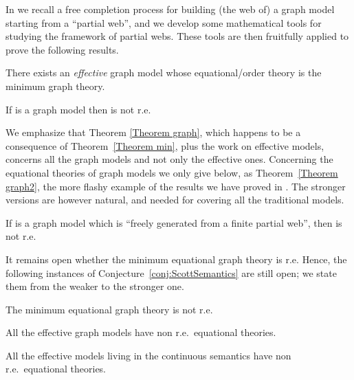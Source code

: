 \documentclass[english]{llncs}
\begin{document}
In \cite[Chapter~5]{ManzonettoTh} we recall a free completion process for building (the web of) a graph model starting from a ``partial web'',
and we develop some mathematical tools for studying the framework of partial webs. 
These tools are then fruitfully applied to prove the following results.

\begin{theorem}\label{Theorem min} \cite[Thm.~6.4.22]{ManzonettoTh}
There exists an \emph{effective} graph model whose equational/order theory is the minimum graph theory.
\end{theorem}

\begin{theorem}\label{Theorem graph} \cite[Thm.~6.4.24]{ManzonettoTh}
If  is a graph model then  is not r.e.
\end{theorem}

We emphasize that Theorem \ref{Theorem graph}, which happens to be a consequence of Theorem~\ref{Theorem min}, 
plus the work on effective models, concerns all the graph models and not only the effective ones.
Concerning the equational theories of graph models we only give below, as Theorem~\ref{Theorem graph2}, the more flashy example of the results 
we have proved in \cite[Subsection~6.4.3]{ManzonettoTh}. 
The stronger versions are however natural, and needed for covering all the traditional models.


\begin{theorem}\label{Theorem graph2} \cite[Thm.~6.4.11]{ManzonettoTh}
If  is a graph model which is ``freely generated from a finite partial web'', then  is not r.e.
\end{theorem}

It remains open whether the minimum equational graph theory is r.e.
Hence, the following instances of Conjecture~\ref{conj:ScottSemantics}  are still open; we state them from the weaker to the stronger one.



\begin{conjecture}
The minimum equational graph theory is not r.e.
\end{conjecture}

\begin{conjecture}
All the effective graph models have non r.e.\ equational theories.
\end{conjecture}

\begin{conjecture}
All the effective models living in the continuous semantics have non r.e.\ equational theories.
\end{conjecture}
\end{document}
